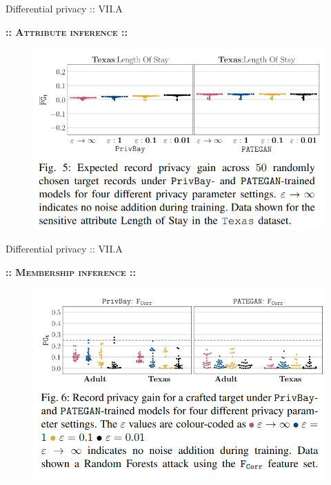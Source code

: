 \documentclass[xcolor=dvipsnames,compress]{beamer}
\newcommand{\intertitle}[1]{\vspace{0.1cm}\textbf{:: \textsc{#1} ::}\vspace{0.1cm}}
\newcommand{\centertitle}[1]{\begin{center}\intertitle{#1}\end{center}}
\begin{document}
\begin{frame}{Differential privacy :: VII.A}
	\vspace{1cm}
	\centertitle{Attribute inference}
	\begin{figure}
	\centering
	\includegraphics[scale=0.35]{images/fig5.png}
	\end{figure}
\end{frame}

\begin{frame}{Differential privacy :: VII.A}
	\vspace{1cm}
	\centertitle{Membership inference}
	\begin{figure}
	\centering
	\includegraphics[scale=0.35]{images/fig6.png}
	\end{figure}
\end{frame}
\end{document}
